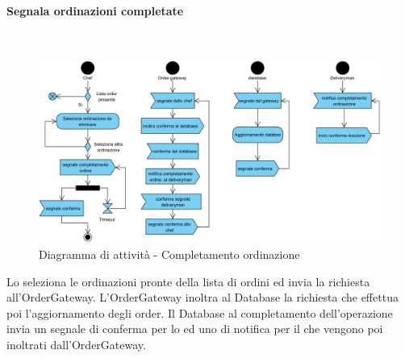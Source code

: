 \begin{samepage}
	\paragraph{Segnala ordinazioni completate}\mbox{}\\
	\begin{figure}[H]
		\centering
		\includegraphics[width=14cm]{diagrammi_img/attivita/chef_comlete_order.png}
		\caption{Diagramma di attività - Completamento ordinazione}
	\end{figure}
\end{samepage}
Lo \Chef{} seleziona le ordinazioni pronte della lista di ordini ed invia la richiesta all'Order\-Gateway. L'Order\-Gateway inoltra al Database la richiesta che effettua poi l'aggiornamento degli order. Il Database al completamento dell'operazione invia un segnale di conferma per lo \Chef{} ed uno di notifica per il \Deliveryman{} che vengono poi inoltrati dall'Order\-Gateway.

\subsubsection{\Deliveryman{}}

